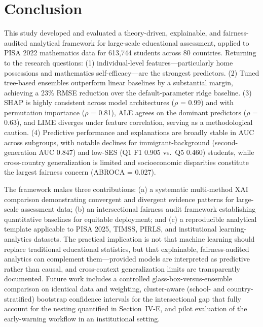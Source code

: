 \documentclass[journal]{IEEEtran}
\begin{document}
\section{Conclusion}
This study developed and evaluated a theory-driven, explainable, and fairness-audited analytical framework for large-scale educational assessment, applied to PISA 2022 mathematics data for 613,744 students across 80 countries. Returning to the research questions: (1) individual-level features---particularly home possessions and mathematics self-efficacy---are the strongest predictors. (2) Tuned tree-based ensembles outperform linear baselines by a substantial margin, achieving a 23\% RMSE reduction over the default-parameter ridge baseline. (3) SHAP is highly consistent across model architectures ($\rho$ = 0.99) and with permutation importance ($\rho$ = 0.81), ALE agrees on the dominant predictors ($\rho$ = 0.63), and LIME diverges under feature correlation, serving as a methodological caution. (4) Predictive performance and explanations are broadly stable in AUC across subgroups, with notable declines for immigrant-background (second-generation AUC 0.847) and low-SES (Q1 F1 0.905 vs.\ Q5 0.460) students, while cross-country generalization is limited and socioeconomic disparities constitute the largest fairness concern (ABROCA = 0.027).

The framework makes three contributions: (a) a systematic multi-method XAI comparison demonstrating convergent and divergent evidence patterns for large-scale assessment data; (b) an intersectional fairness audit framework establishing quantitative baselines for equitable deployment; and (c) a reproducible analytical template applicable to PISA 2025, TIMSS, PIRLS, and institutional learning-analytics datasets. The practical implication is not that machine learning should replace traditional educational statistics, but that explainable, fairness-audited analytics can complement them---provided models are interpreted as predictive rather than causal, and cross-context generalization limits are transparently documented. Future work includes a controlled glass-box-versus-ensemble comparison on identical data and weighting, cluster-aware (school- and country-stratified) bootstrap confidence intervals for the intersectional gap that fully account for the nesting quantified in Section~IV-E, and pilot evaluation of the early-warning workflow in an institutional setting.

\end{document}
